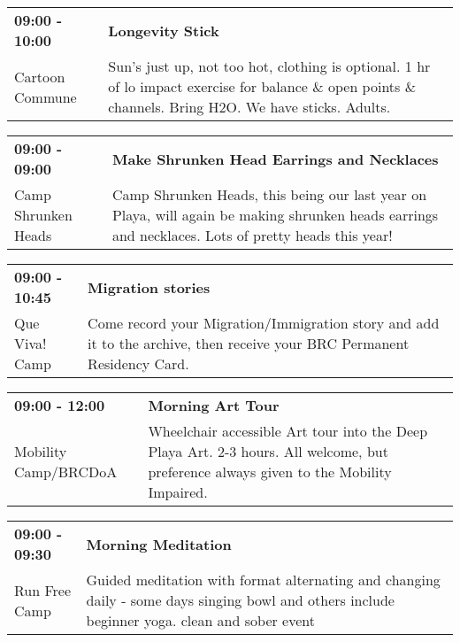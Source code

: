 \begin{tabular}{ p{1in} p{2.2in} }
    \textbf{09:00 - 10:00} & \textbf{Longevity Stick} \\
    Cartoon Commune \newline  & Sun's just up, not too hot, clothing is optional. 1 hr of lo impact exercise for balance \& open points \& channels. Bring H2O. We have sticks. Adults. \\
    \hline 
\end{tabular}
    
\begin{tabular}{ p{1in} p{2.2in} }
    \textbf{09:00 - 09:00} & \textbf{Make Shrunken Head Earrings and Necklaces} \\
    Camp Shrunken Heads \newline  & Camp Shrunken Heads, this being our last year on Playa, will again be making shrunken heads earrings and necklaces. Lots of pretty heads this year! \\
    \hline 
\end{tabular}
    
\begin{tabular}{ p{1in} p{2.2in} }
    \textbf{09:00 - 10:45} & \textbf{Migration stories} \\
    Que Viva! Camp \newline  & Come record your Migration/Immigration story and add it to the archive, then receive your BRC Permanent Residency Card. \\
    \hline 
\end{tabular}
    
\begin{tabular}{ p{1in} p{2.2in} }
    \textbf{09:00 - 12:00} & \textbf{Morning Art Tour} \\
    Mobility Camp/BRCDoA \newline  & Wheelchair accessible Art tour into the Deep Playa Art.
2-3 hours. All welcome, but preference always given to the Mobility Impaired. \\
    \hline 
\end{tabular}
    
\begin{tabular}{ p{1in} p{2.2in} }
    \textbf{09:00 - 09:30} & \textbf{Morning Meditation} \\
    Run Free Camp \newline  & Guided meditation with format alternating and changing daily - some days singing bowl and others include beginner yoga. clean and sober event \\
    \hline 
\end{tabular}
    
